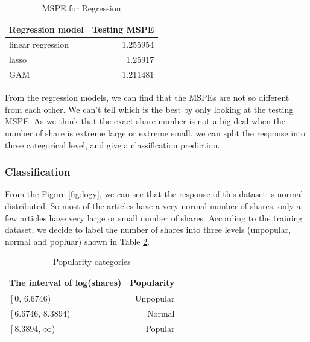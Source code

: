 \documentclass[12pt]{article}
\begin{document}
    \begin{table}[h]
        \centering
        \caption{MSPE for Regression}
        \begin{tabular}{ l | r }
            \hline\hline
            Regression model & Testing MSPE\\
            \hline
            linear regression & 1.255954 \\
            lasso & 1.25917 \\
            GAM & 1.211481 \\
            \hline\hline
        \end{tabular}
        \label{table:1}
    \end{table}

From the regression models, we can find that the MSPEs are not so different from each other. We can't tell which is the best by only looking at the testing MSPE. As we think that the exact share number is not a big deal when the number of share is extreme large or extreme small, we can split the response into three categorical level, and give a classification prediction.

\subsubsection{Classification}
From the Figure \ref{fig:logy}, we can see that the response of this dataset is normal distributed. So 
most of the articles have a very normal number of shares, only a few articles have very large or small number of shares. According to the training dataset, we decide to label the number of shares into three levels (unpopular, normal and popluar) shown in Table \ref{table:Popularity}. \\
    \begin{table}[h]
        \centering
        \caption{Popularity categories}
        \begin{tabular}{ l | r }
            \hline\hline
            The interval of log(shares) & Popularity\\
            \hline
            $\left[$0, 6.6746) & Unpopular \\
            $\left[$6.6746, 8.3894) & Normal \\
            $\left[$8.3894, $\infty$) & Popular \\
            \hline\hline
        \end{tabular}
        \label{table:Popularity}
    \end{table}
\end{document}

